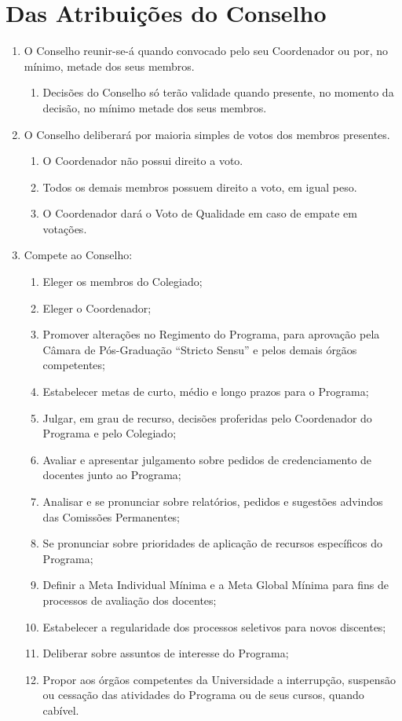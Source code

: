 \documentclass{article}
\newcommand{\singleitem}{\item[Parágrafo Único.]}
\newcommand{\grupoMenor}{Colegiado\xspace}
\newcommand{\grupoMaior}{Conselho\xspace}
\begin{document}
\section{Das Atribuições do \grupoMaior}
\begin{enumerate}

	\item O \grupoMaior reunir-se-á quando convocado pelo seu Coordenador ou por, no mínimo, metade dos seus membros.
	\begin{enumerate}
		\singleitem Decisões do \grupoMaior só terão validade quando presente, no momento da decisão, no mínimo metade dos seus membros.
	\end{enumerate}

	\item O \grupoMaior deliberará por maioria simples de votos dos membros presentes.
	\begin{enumerate}
		\item O Coordenador não possui direito a voto.
		\item Todos os demais membros possuem direito a voto, em igual peso.
		\item O Coordenador dará o Voto de Qualidade em caso de empate em votações. 
	\end{enumerate}

	\item Compete ao \grupoMaior:
	\begin{enumerate}[label=\Roman*]
		\item Eleger os membros do \grupoMenor;
		\item Eleger o Coordenador;		
		\item Promover alterações no Regimento do Programa, para aprovação pela Câmara de Pós-Graduação ``Stricto Sensu'' e pelos demais órgãos competentes;
		\item Estabelecer metas de curto, médio e longo prazos para o Programa;
		\item Julgar, em grau de recurso, decisões proferidas pelo Coordenador do Programa e pelo \grupoMenor;
		\item Avaliar e apresentar julgamento sobre pedidos de credenciamento de docentes junto ao Programa;
		\item Analisar e se pronunciar sobre relatórios, pedidos e sugestões advindos das Comissões Permanentes;
		\item Se pronunciar sobre prioridades de aplicação de recursos específicos do Programa;
		\item Definir a Meta Individual Mínima e a Meta Global Mínima para fins de processos de avaliação dos docentes;
		\item Estabelecer a regularidade dos processos seletivos para novos discentes;
		\item Deliberar sobre assuntos de interesse do Programa;		
		\item Propor aos órgãos competentes da Universidade a interrupção, suspensão ou cessação das atividades do Programa ou de seus cursos, quando cabível.
	\end{enumerate}


\end{enumerate}
\end{document}
